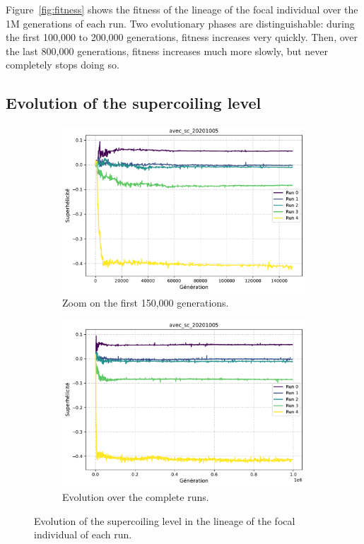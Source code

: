 Figure~\ref{fig:fitness} shows the fitness of the lineage of the focal individual over the 1M generations of each run.
Two evolutionary phases are distinguishable: during the first 100,000 to 200,000 generations, fitness increases very quickly.
Then, over the last 800,000 generations, fitness increases much more slowly, but never completely stops doing so.


\subsection{Evolution of the supercoiling level}

\begin{figure}[h!]
  \centering
  \begin{subfigure}[b]{0.49\textwidth}
    \includegraphics[width=\textwidth]{aevol/images/superhelicite_agrege_zoom.pdf}
    \caption{Zoom on the first 150,000 generations.}
    \label{fig:sc_zoom}
  \end{subfigure}
  \begin{subfigure}[b]{0.49\textwidth}
    \includegraphics[width=\textwidth]{aevol/images/superhelicite_agrege.pdf}
    \caption{Evolution over the complete runs.}
    \label{fig:sc_all}
  \end{subfigure}
  \caption{Evolution of the supercoiling level in the lineage of the focal individual of each run.}
  \label{fig:sc}
\end{figure}

